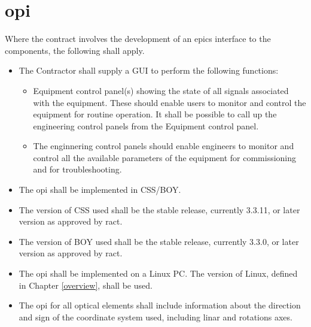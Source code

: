 \documentclass[11pt
  , a4paper
  , article
  , oneside
]{memoir}
\begin{document}
\section{\Gls{opi}}
Where the contract involves the development of an \Gls{epics} interface to the components, the following shall apply.
\begin{itemize}
\item The Contractor shall supply a GUI to perform the following functions:
  \begin{itemize}
  \item Equipment control panel(s) showing the state of all signals associated with the equipment. These should enable users to monitor and control the equipment for routine operation. It shall be possible to call up the engineering control panels from the Equipment control panel.
  \item The enginnering control panels should enable engineers to monitor and control all the available parameters of the equipment for commissioning and for troubleshooting.
  \end{itemize}
\item The \Gls{opi} shall be implemented in CSS/BOY.
\item The version of CSS used shall be the stable release, currently 3.3.11, or later version as approved by \Gls{ract}.
\item The version of BOY used shall be the stable release, currently 3.3.0, or later version as approved by \Gls{ract}.
\item The \Gls{opi} shall be implemented on a Linux PC. The version of Linux, defined in Chapter \ref{overview}, shall be used.
\item The \Gls{opi} for all optical elements shall include information about the direction and sign of the coordinate system used, including linar and rotations axes.

\end{itemize}
\end{document}
